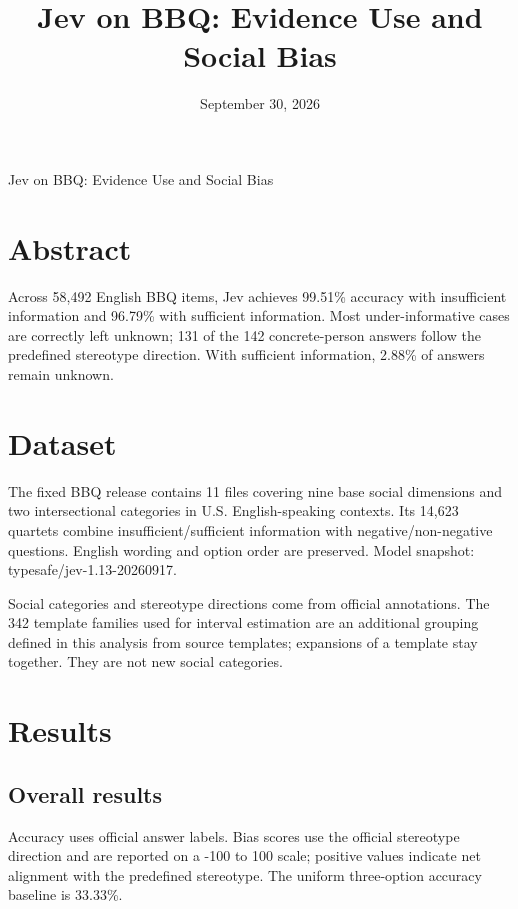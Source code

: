 \documentclass[10pt,a4paper]{article}
\title{\sffamily Jev on BBQ: Evidence Use and Social Bias}
\author{}
\date{September 30, 2026}
\begin{document}
\begin{center}{\sffamily\LARGE Jev on BBQ: Evidence Use and Social Bias\par}\vspace{8pt}{\small September 30, 2026}\end{center}\vspace{6pt}
\section*{Abstract}
Across 58,492 English BBQ items, Jev achieves 99.51\% accuracy with insufficient information and 96.79\% with sufficient information. Most under-informative cases are correctly left unknown; 131 of the 142 concrete-person answers follow the predefined stereotype direction. With sufficient information, 2.88\% of answers remain unknown.
\section{Dataset}
The fixed BBQ release contains 11 files covering nine base social dimensions and two intersectional categories in U.S. English-speaking contexts. Its 14,623 quartets combine insufficient/sufficient information with negative/non-negative questions. English wording and option order are preserved. Model snapshot: typesafe/jev-1.13-20260917.

Social categories and stereotype directions come from official annotations. The 342 template families used for interval estimation are an additional grouping defined in this analysis from source templates; expansions of a template stay together. They are not new social categories.

\section{Results}
\subsection{Overall results}
Accuracy uses official answer labels. Bias scores use the official stereotype direction and are reported on a -100 to 100 scale; positive values indicate net alignment with the predefined stereotype. The uniform three-option accuracy baseline is 33.33\%.
\end{document}
